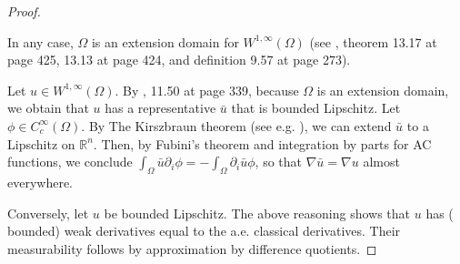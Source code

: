 \documentclass[english,a4paper,9pt,oneside]{scrbook}	%
\theoremstyle{break}
\newenvironment{mproof}[1][\proofname]{%
  \begin{proof}[#1]$ $\par\nobreak\ignorespaces
}{%
  \end{proof}
}
\renewcommand*{\proofname}{Proof}
\theoremstyle{remark}
\newcommand{\ds}{\displaystyle}
\newcommand{\cc}{\subset\subset}
\begin{document}
\begin{appendices}
\begin{mproof}
%
%
%
%

In any case, $\Omega$ is an extension domain for $W^{1,\infty}(\Omega)$ (see \cite{leoni}, theorem 13.17 at page 425, 13.13 at page 424, and definition 9.57 at page 273).

Let $u \in  W^{1,\infty}(\Omega)$. By \cite{leoni}, 11.50 at page 339, because $\Omega$ is an extension domain, we obtain that $u$ has a representative $\bar{u}$ that is bounded Lipschitz. Let $\phi \in C_c^\infty(\Omega)$. By The Kirszbraun theorem (see e.g. \cite{kirszbraun}), we can extend $\bar{u}$ to a Lipschitz on $\mathbb{R}^n$. Then, by Fubini's theorem and integration by parts for AC functions, we conclude $\ds \int_\Omega\bar{u}\partial_i\phi =-\int_{\Omega} \partial_i \bar{u} \phi $, so that $\nabla \bar{u} = \nabla u$ almost everywhere.

Conversely, let $u$ be bounded Lipschitz. The above reasoning shows that $u$ has ( bounded) weak derivatives equal to the a.e. classical derivatives. Their measurability follows by approximation by difference quotients.
\end{mproof}


\end{appendices}
\end{document}
